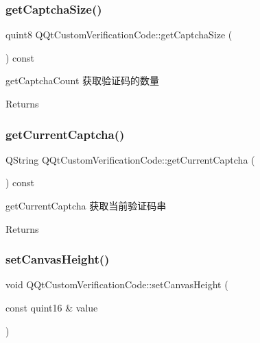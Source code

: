 \subsubsection{\texorpdfstring{get\+Captcha\+Size()}{getCaptchaSize()}}
{\footnotesize\ttfamily quint8 Q\+Qt\+Custom\+Verification\+Code\+::get\+Captcha\+Size (\begin{DoxyParamCaption}{ }\end{DoxyParamCaption}) const}



get\+Captcha\+Count 获取验证码的数量 

\begin{DoxyReturn}{Returns}

\end{DoxyReturn}
\mbox{\label{class_q_qt_custom_verification_code_ad6540b4058bef47ba80b1e850bbe3bdb}} 
\subsubsection{\texorpdfstring{get\+Current\+Captcha()}{getCurrentCaptcha()}}
{\footnotesize\ttfamily Q\+String Q\+Qt\+Custom\+Verification\+Code\+::get\+Current\+Captcha (\begin{DoxyParamCaption}{ }\end{DoxyParamCaption}) const}



get\+Current\+Captcha 获取当前验证码串 

\begin{DoxyReturn}{Returns}

\end{DoxyReturn}
\mbox{\label{class_q_qt_custom_verification_code_ab1eadf9434141d948142b26d3917aff2}} 
\subsubsection{\texorpdfstring{set\+Canvas\+Height()}{setCanvasHeight()}}
{\footnotesize\ttfamily void Q\+Qt\+Custom\+Verification\+Code\+::set\+Canvas\+Height (\begin{DoxyParamCaption}\item[{const quint16 \&}]{value }\end{DoxyParamCaption})}



